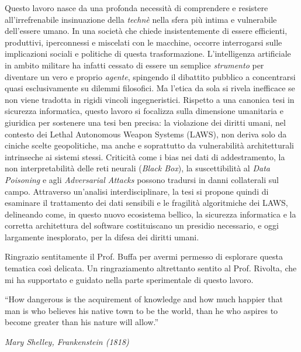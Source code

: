 \ifstampa\documentclass[a4paper,12pt,twoside,openright]{report}\else\documentclass[a4paper,12pt]{report}\fi
\newif\ifrevisione \revisionefalse
\DeclareRobustCommand{\rev}[1]{\ifrevisione{\color{blue!65!black}#1}\else#1\fi}
\begin{document}
Questo lavoro nasce da una profonda necessità di comprendere e resistere all'irrefrenabile insinuazione della \textit{technè} nella sfera più intima e vulnerabile dell'essere umano. In una società che chiede insistentemente di essere efficienti, produttivi, iperconnessi e miscelati con le macchine, occorre interrogarsi sulle implicazioni sociali e politiche di questa trasformazione.
L'intelligenza artificiale in ambito militare ha infatti cessato di essere un semplice \textit{strumento} per diventare un vero e proprio \textit{agente}, spingendo il dibattito pubblico a concentrarsi quasi esclusivamente su dilemmi filosofici. Ma l'etica da sola si rivela inefficace se non viene tradotta in rigidi vincoli ingegneristici.
Rispetto a una canonica tesi in sicurezza informatica, questo lavoro si focalizza sulla dimensione umanitaria e giuridica per \rev{sostenere} una tesi ben precisa: la violazione dei diritti umani, nel contesto dei Lethal Autonomous Weapon Systems (LAWS), non deriva solo da ciniche scelte geopolitiche, ma anche e soprattutto da vulnerabilità architetturali intrinseche ai sistemi stessi. Criticità come i bias nei dati di addestramento, la non interpretabilità delle reti neurali (\textit{Black Box}), la suscettibilità al \textit{Data Poisoning} e agli \textit{Adversarial Attacks} \rev{possono tradursi} in danni collaterali sul campo.
Attraverso un'analisi interdisciplinare, la tesi si propone quindi di esaminare il trattamento dei dati sensibili e le fragilità algoritmiche dei LAWS, delineando come, in questo nuovo ecosistema bellico, la sicurezza informatica e la corretta architettura del software costituiscano un presidio necessario, e oggi largamente inesplorato, per la difesa dei diritti umani.

Ringrazio sentitamente il Prof. Buffa per avermi permesso di esplorare questa tematica così delicata.
Un ringraziamento altrettanto sentito al Prof. Rivolta, che mi ha supportato e guidato nella parte sperimentale di questo lavoro.


\afterpreface


\begin{flushright}
\begin{minipage}{0.6\textwidth}
\epigraph{
    ``How dangerous is the acquirement of knowledge and how much happier that man is who believes his native town to be the world, than he who aspires to become greater than his nature will allow.''
}{\textit{Mary Shelley, Frankenstein (1818)}}
\end{minipage}
\end{flushright}
 
\end{document}
